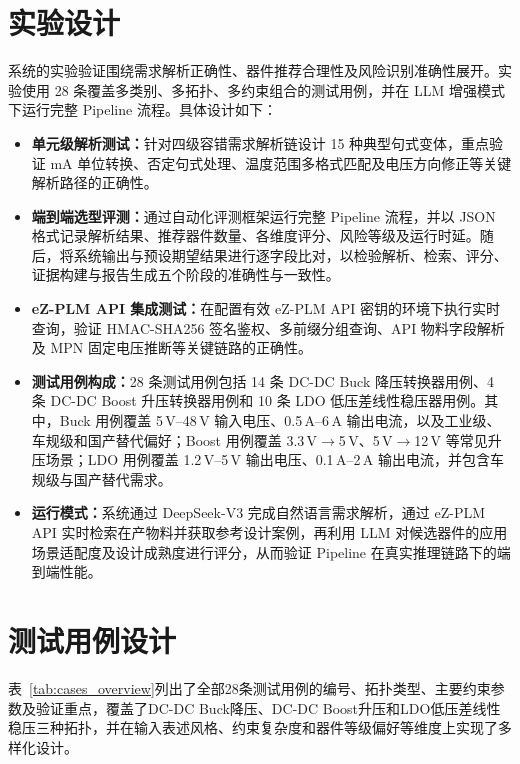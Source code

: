 \section{实验设计}
系统的实验验证围绕需求解析正确性、器件推荐合理性及风险识别准确性展开。实验使用 28 条覆盖多类别、多拓扑、多约束组合的测试用例，并在 LLM 增强模式下运行完整 Pipeline 流程。具体设计如下：
\begin{itemize}
    \item \textbf{单元级解析测试：}针对四级容错需求解析链设计 15 种典型句式变体，重点验证 mA 单位转换、否定句式处理、温度范围多格式匹配及电压方向修正等关键解析路径的正确性。

    \item \textbf{端到端选型评测：}通过自动化评测框架运行完整 Pipeline 流程，并以 JSON 格式记录解析结果、推荐器件数量、各维度评分、风险等级及运行时延。随后，将系统输出与预设期望结果进行逐字段比对，以检验解析、检索、评分、证据构建与报告生成五个阶段的准确性与一致性。

    \item \textbf{eZ-PLM API 集成测试：}在配置有效 eZ-PLM API 密钥的环境下执行实时查询，验证 HMAC-SHA256 签名鉴权、多前缀分组查询、API 物料字段解析及 MPN 固定电压推断等关键链路的正确性。

    \item \textbf{测试用例构成：}28 条测试用例包括 14 条 DC-DC Buck 降压转换器用例、4 条 DC-DC Boost 升压转换器用例和 10 条 LDO 低压差线性稳压器用例。其中，Buck 用例覆盖 5\,V--48\,V 输入电压、0.5\,A--6\,A 输出电流，以及工业级、车规级和国产替代偏好；Boost 用例覆盖 3.3\,V$\rightarrow$5\,V、5\,V$\rightarrow$12\,V 等常见升压场景；LDO 用例覆盖 1.2\,V--5\,V 输出电压、0.1\,A--2\,A 输出电流，并包含车规级与国产替代需求。

    \item \textbf{运行模式：}系统通过 DeepSeek-V3 完成自然语言需求解析，通过 eZ-PLM API 实时检索在产物料并获取参考设计案例，再利用 LLM 对候选器件的应用场景适配度及设计成熟度进行评分，从而验证 Pipeline 在真实推理链路下的端到端性能。
\end{itemize}

\section{测试用例设计}

表~\ref{tab:cases_overview}列出了全部28条测试用例的编号、拓扑类型、主要约束参数及验证重点，覆盖了DC-DC Buck降压、DC-DC Boost升压和LDO低压差线性稳压三种拓扑，并在输入表述风格、约束复杂度和器件等级偏好等维度上实现了多样化设计。

